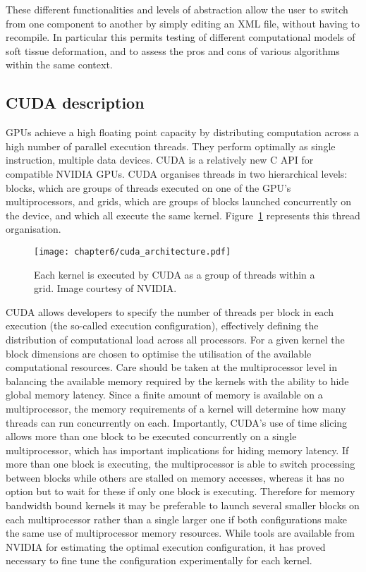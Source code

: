 These different functionalities and levels of abstraction allow the user to switch from one component to another by simply editing an XML file, without having to recompile. In particular this permits testing of different computational models of soft tissue deformation, and to assess the pros and cons of various algorithms within the same context.


	
	\subsection{CUDA description}
GPUs achieve a high floating point capacity by distributing computation across a high number of parallel execution threads. They perform optimally as single instruction, multiple data devices. CUDA is a relatively new C API for compatible NVIDIA GPUs. CUDA organises threads in two hierarchical levels: blocks, which are groups of threads executed on one of the GPU's multiprocessors, and grids, which are groups of blocks launched concurrently on the device, and which all execute the same kernel. Figure~\ref{chap6:fig-cuda} represents this thread organisation. 

\begin{figure}
\begin{center}
\texttt{[image: chapter6/cuda\_architecture.pdf]} 
\caption[CUDA architecture] {Each kernel is executed by CUDA as a group of threads within a grid. Image courtesy of NVIDIA. }
\label{chap6:fig-cuda}
\end{center}
\end{figure}           

CUDA allows developers to specify the number of threads per block in each execution (the so-called execution configuration), effectively defining the distribution of computational load across all processors. For a given kernel the block dimensions are chosen to optimise the utilisation of the available computational resources. Care should be taken at the multiprocessor level in balancing the available memory required by the kernels with the ability to hide global memory latency. Since a finite amount of memory is available on a multiprocessor, the memory requirements of a kernel will determine how many threads can run concurrently on each. Importantly, CUDA's use of time slicing allows more than one block to be executed concurrently on a single multiprocessor, which has important implications for hiding memory latency. If more than one block is executing, the multiprocessor is able to switch processing between blocks while others are stalled on memory accesses, whereas it has no option but to wait for these if only one block is executing. Therefore for memory bandwidth bound kernels it may be preferable to launch several smaller blocks on each multiprocessor rather than a single larger one if both configurations make the same use of multiprocessor memory resources. While tools are available from NVIDIA for estimating the optimal execution configuration, it has proved necessary to fine tune the configuration experimentally for each kernel.



